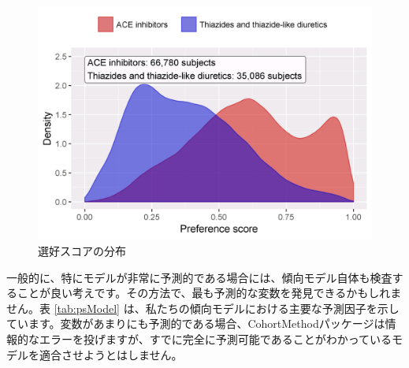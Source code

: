 \documentclass[
  11pt]{book}
\theoremstyle{definition}
\theoremstyle{definition}
\theoremstyle{definition}
\theoremstyle{definition}
\theoremstyle{remark}
\begin{document}
\begin{figure}

{\centering \includegraphics[width=0.8\linewidth]{images/PopulationLevelEstimation/ps} 

}

\caption{選好スコアの分布}\label{fig:ps}
\end{figure}

一般的に、特にモデルが非常に予測的である場合には、傾向モデル自体も検査することが良い考えです。その方法で、最も予測的な変数を発見できるかもしれません。表 \ref{tab:psModel} は、私たちの傾向モデルにおける主要な予測因子を示しています。変数があまりにも予測的である場合、CohortMethodパッケージは情報的なエラーを投げますが、すでに完全に予測可能であることがわかっているモデルを適合させようとはしません。 
\end{document}
